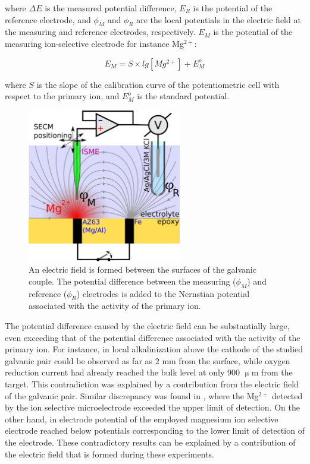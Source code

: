 where $\Delta E$ is the measured potential difference, $E_R$ is the potential of the reference electrode, and $\phi_M$ and $\phi_R$ are the local potentials in the electric field at the measuring and reference electrodes, respectively. $E_M$ is the potential of the measuring ion-selective electrode for instance Mg$^{2+}$:

\begin{equation}
E_M = S \times lg[Mg^{2+}] + E_M^o
\label{eq:measuring}
\end{equation}

where $S$ is the slope of the calibration curve of the potentiometric cell with respect to the primary ion, and $E_M^o$ is the standard potential.

\begin{figure}[b]
\centering
\includegraphics[width=0.6\textwidth]{img/field/field.eps}
\caption{An electric field is formed between the surfaces of the galvanic couple. The potential difference between the measuring ($\phi_M$) and reference ($\phi_R$) electrodes is added to the Nernstian potential associated with the activity of the primary ion.}
\label{fig:field}
\end{figure}

The potential difference caused by the electric field can be substantially large, even exceeding that of the potential difference associated with the activity of the primary ion.
For instance, in \cite{izquierdo2013potentiometric} local alkalinization above the cathode of the studied galvanic pair could be observed as far as 2 mm from the surface, while oxygen reduction current had already reached the bulk level at only 900 $\upmu$m from the target.
This contradiction was explained by a contribution from the electric field of the galvanic pair.
Similar discrepancy was found in \cite{souto2013spatially, souto2012progress, izquierdo2013development}, where the Mg$^{2+}$ detected by the ion selective microelectrode exceeded the upper limit of detection. On the other hand, in \cite{izquierdo2016imaging} electrode potential of the employed magnesium ion selective electrode reached below potentials corresponding to the lower limit of detection of the electrode. These contradictory results can be explained by a contribution of the electric field that is formed during these experiments. 

